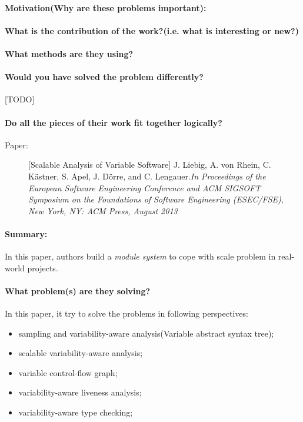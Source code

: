 \documentclass[12pt]{article}
\begin{document}
\paragraph{Motivation(Why are these problems important):}
\paragraph{What is the contribution of the work?(i.e. what is interesting or new?)}
\paragraph{What methods are they using?}
\paragraph{Would you have solved the problem differently?}[TODO]
\paragraph{Do all the pieces of their work fit together logically?}


\clearpage
\begin{description}
\item[Paper:] [Scalable Analysis of Variable Software] J. Liebig, A. von Rhein, C. Kästner, S. Apel, J. Dörre, and C. Lengauer.\emph{In Proceedings of the European Software Engineering Conference and ACM SIGSOFT Symposium on the Foundations of Software Engineering (ESEC/FSE), New York, NY: ACM Press, August 2013} 
\end{description}

\paragraph{Summary:} In this paper, authors build a \textit{module system} to cope with scale problem in real-world projects. 
\paragraph{What problem(s) are they solving?} In this paper, it try to solve the problems in following perspectives: 
\begin{itemize}
	\item sampling and variability-aware analysis(Variable abstract syntax tree);
	\item scalable variability-aware analysis;
	\item variable control-flow graph;
	\item variability-aware liveness analysis;
	\item variability-aware type checking;
\end{itemize}
\end{document}
